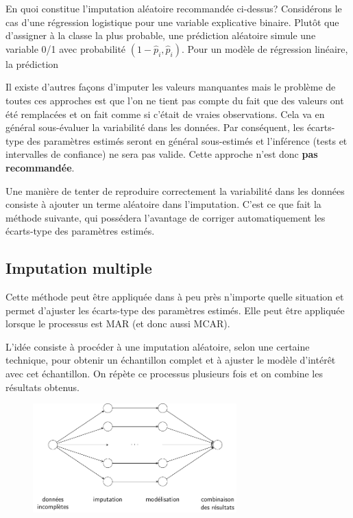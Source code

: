 \documentclass[
  11pt,
  letterpaper,
]{scrbook}
\theoremstyle{definition}
\theoremstyle{remark}
\begin{document}
En quoi constitue l'imputation aléatoire recommandée ci-dessus?
Considérons le cas d'une régression logistique pour une variable
explicative binaire. Plutôt que d'assigner à la classe la plus probable,
une prédiction aléatoire simule une variable 0/1 avec probabilité
\((1-\widehat{p}_i, \widehat{p}_i)\). Pour un modèle de régression
linéaire, la prédiction

Il existe d'autres façons d'imputer les valeurs manquantes mais le
problème de toutes ces approches est que l'on ne tient pas compte du
fait que des valeurs ont été remplacées et on fait comme si c'était de
vraies observations. Cela va en général sous-évaluer la variabilité dans
les données. Par conséquent, les écarts-type des paramètres estimés
seront en général sous-estimés et l'inférence (tests et intervalles de
confiance) ne sera pas valide. Cette approche n'est donc \textbf{pas
recommandée}.

Une manière de tenter de reproduire correctement la variabilité dans les
données consiste à ajouter un terme aléatoire dans l'imputation. C'est
ce que fait la méthode suivante, qui possédera l'avantage de corriger
automatiquement les écarts-type des paramètres estimés.

\hypertarget{imputation-multiple}{%
\subsection{Imputation multiple}\label{imputation-multiple}}

Cette méthode peut être appliquée dans à peu près n'importe quelle
situation et permet d'ajuster les écarts-type des paramètres estimés.
Elle peut être appliquée lorsque le processus est MAR (et donc aussi
MCAR).

L'idée consiste à procéder à une imputation aléatoire, selon une
certaine technique, pour obtenir un échantillon complet et à ajuster le
modèle d'intérêt avec cet échantillon. On répète ce processus plusieurs
fois et on combine les résultats obtenus.

\begin{figure}[ht!]

{\centering \includegraphics[width=0.7\textwidth,height=\textheight]{figures/donnees_manquantes_workflow.pdf}

}

\end{figure}
\end{document}
